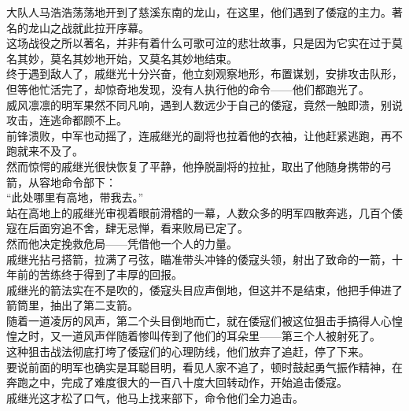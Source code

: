 \begin{multicols}{\theparacolNo}
大队人马浩浩荡荡地开到了慈溪东南的龙山，在这里，他们遇到了倭寇的主力。著名的龙山之战就此拉开序幕。\\

这场战役之所以著名，并非有着什么可歌可泣的悲壮故事，只是因为它实在过于莫名其妙，莫名其妙地开始，又莫名其妙地结束。\\

终于遇到敌人了，戚继光十分兴奋，他立刻观察地形，布置谋划，安排攻击队形，但等他忙活完了，却惊奇地发现，没有人执行他的命令——他们都跑光了。\\

威风凛凛的明军果然不同凡响，遇到人数远少于自己的倭寇，竟然一触即溃，别说攻击，连逃命都顾不上。\\

前锋溃败，中军也动摇了，连戚继光的副将也拉着他的衣袖，让他赶紧逃跑，再不跑就来不及了。\\

然而惊愕的戚继光很快恢复了平静，他挣脱副将的拉扯，取出了他随身携带的弓箭，从容地命令部下：\\

“此处哪里有高地，带我去。”\\

站在高地上的戚继光审视着眼前滑稽的一幕，人数众多的明军四散奔逃，几百个倭寇在后面穷追不舍，肆无忌惮，看来败局已定了。\\

然而他决定挽救危局——凭借他一个人的力量。\\

戚继光拈弓搭箭，拉满了弓弦，瞄准带头冲锋的倭寇头领，射出了致命的一箭，十年前的苦练终于得到了丰厚的回报。\\

戚继光的箭法实在不是吹的，倭寇头目应声倒地，但这并不是结束，他把手伸进了箭筒里，抽出了第二支箭。\\

随着一道凌厉的风声，第二个头目倒地而亡，就在倭寇们被这位狙击手搞得人心惶惶之时，又一道风声伴随着惨叫传到了他们的耳朵里——第三个人被射死了。\\

这种狙击战法彻底打垮了倭寇们的心理防线，他们放弃了追赶，停了下来。\\

要说前面的明军也确实是耳聪目明，看见人家不追了，顿时鼓起勇气振作精神，在奔跑之中，完成了难度很大的一百八十度大回转动作，开始追击倭寇。\\

戚继光这才松了口气，他马上找来部下，命令他们全力追击。\\


\end{multicols}
